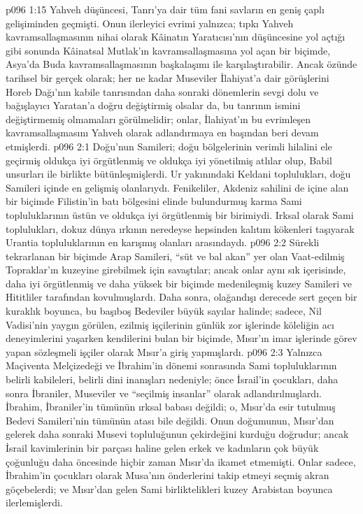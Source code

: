 \vs p096 1:15 Yahveh düşüncesi, Tanrı’ya dair tüm fani savların en geniş çaplı gelişiminden geçmişti. Onun ilerleyici evrimi yalnızca; tıpkı Yahveh kavramsallaşmasının nihai olarak Kâinatın Yaratıcısı’nın düşüncesine yol açtığı gibi sonunda Kâinatsal Mutlak’ın kavramsallaşmasına yol açan bir biçimde, Asya’da Buda kavramsallaşmasının başkalaşımı ile karşılaştırabilir. Ancak özünde tarihsel bir gerçek olarak; her ne kadar Museviler İlahiyat’a dair görüşlerini Horeb Dağı’nın kabile tanrısından daha sonraki dönemlerin sevgi dolu ve bağışlayıcı Yaratan’a doğru değiştirmiş olsalar da, bu tanrının ismini değiştirmemiş olmamaları görülmelidir; onlar, İlahiyat’ın bu evrimleşen kavramsallaşmasını Yahveh olarak adlandırmaya en başından beri devam etmişlerdi.
\vs p096 2:1 Doğu’nun Samileri; doğu bölgelerinin verimli hilalini ele geçirmiş oldukça iyi örgütlenmiş ve oldukça iyi yönetilmiş atlılar olup, Babil unsurları ile birlikte bütünleşmişlerdi. Ur yakınındaki Keldani toplulukları, doğu Samileri içinde en gelişmiş olanlarıydı. Fenikeliler, Akdeniz sahilini de içine alan bir biçimde Filistin’in batı bölgesini elinde bulundurmuş karma Sami topluluklarının üstün ve oldukça iyi örgütlenmiş bir birimiydi. Irksal olarak Sami toplulukları, dokuz dünya ırkının neredeyse hepsinden kalıtım kökenleri taşıyarak Urantia topluluklarının en karışmış olanları arasındaydı.
\vs p096 2:2 Sürekli tekrarlanan bir biçimde Arap Samileri, “süt ve bal akan” yer olan Vaat\hyp{}edilmiş Topraklar’ın kuzeyine girebilmek için savaştılar; ancak onlar aynı sık içerisinde, daha iyi örgütlenmiş ve daha yüksek bir biçimde medenileşmiş kuzey Samileri ve Hititliler tarafından kovulmuşlardı. Daha sonra, olağandışı derecede sert geçen bir kuraklık boyunca, bu başıboş Bedeviler büyük sayılar halinde; sadece, Nil Vadisi’nin yaygın görülen, ezilmiş işçilerinin günlük zor işlerinde köleliğin acı deneyimlerini yaşarken kendilerini bulan bir biçimde, Mısır’ın imar işlerinde görev yapan sözleşmeli işçiler olarak Mısır’a giriş yapmışlardı.
\vs p096 2:3 Yalnızca Maçiventa Melçizedeği ve İbrahim’in dönemi sonrasında Sami topluluklarının belirli kabileleri, belirli dini inanışları nedeniyle; önce İsrail’in çocukları, daha sonra İbraniler, Museviler ve “seçilmiş insanlar” olarak adlandırılmışlardı. İbrahim, İbraniler’in tümünün ırksal babası değildi; o, Mısır’da esir tutulmuş Bedevi Samileri’nin tümünün atası bile değildi. Onun doğumunun, Mısır’dan gelerek daha sonraki Musevi topluluğunun çekirdeğini kurduğu doğrudur; ancak İsrail kavimlerinin bir parçası haline gelen erkek ve kadınların çok büyük çoğunluğu daha öncesinde hiçbir zaman Mısır’da ikamet etmemişti. Onlar sadece, İbrahim’in çocukları olarak Musa’nın önderlerini takip etmeyi seçmiş akran göçebelerdi; ve Mısır’dan gelen Sami birliktelikleri kuzey Arabistan boyunca ilerlemişlerdi.

